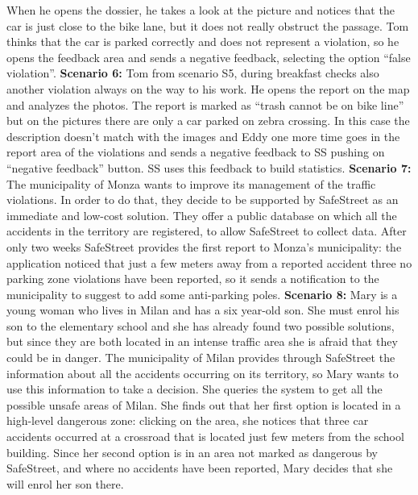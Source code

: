 \documentclass[../RASD.tex]{subfiles}
\begin{document}
                When he opens the dossier, he takes a look at the picture and notices that the car is just close to the bike lane,
                but it does not really obstruct the passage.
                Tom thinks that the car is parked correctly and does not represent a violation, so he opens the feedback area and sends a negative feedback,
                selecting the option “false violation”.
                \newline
                \newline
                \textbf{Scenario 6:} Tom from scenario S5, during breakfast checks also another violation always on the way to his work.
                 He opens the report on the map and analyzes the photos.
                 The report is marked as “trash cannot be on bike line” but on the pictures there are only a car parked on zebra crossing.
                 In this case the description doesn’t match with the images and Eddy one more time goes in the report area of the violations and sends
                 a negative feedback to SS pushing on “negative feedback” button.
                 SS uses this feedback to build statistics.
                \newline
                \newline
                \textbf{Scenario 7:} The municipality of Monza wants to improve its management of the traffic violations.
                In order to do that, they decide to be supported by SafeStreet as an immediate and low-cost solution.
                They offer a public database on which all the accidents in the territory are registered, to allow SafeStreet to collect data.
                After only two weeks SafeStreet provides the first report to Monza’s municipality: the application noticed that just a few meters away
                from a reported accident three no parking zone violations have been reported, so it sends a notification to the municipality
                to suggest to add some anti-parking poles.
                \newline
                \newline
                \textbf{Scenario 8:} Mary is a young woman who lives in Milan and has a six year-old son.
                She must enrol his son to the elementary school and she has already found two possible solutions, but since they are both
                located in an intense traffic area she is afraid that they could be in danger.
                The municipality of Milan provides through SafeStreet the information about all the accidents occurring on its territory,
                so Mary wants to use this information to take a decision.
                She queries the system to get all the possible unsafe areas of Milan.
                She finds out that her first option is located in a high-level dangerous zone: clicking on the area, she notices that three car accidents
                occurred at a crossroad that is located just few meters from the school building.
                Since her second option is in an area not marked as dangerous by SafeStreet, and where no accidents have been reported,
                Mary decides that she will enrol her son there.
\end{document}
